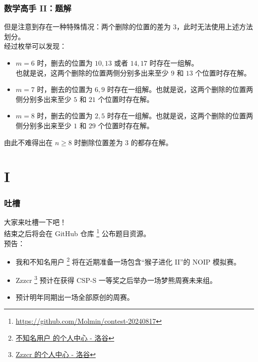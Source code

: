\documentclass{beamer}
\begin{document}
\begin{frame}
\frametitle{数学高手 II：题解}
但是注意到存在一种特殊情况：两个删除的位置的差为 $3$，此时无法使用上述方法划分。\\
\pause
经过枚举可以发现：
\begin{itemize}
\item $m=6$ 时，删去的位置为 $10,13$ 或者 $14,17$ 时存在一组解。\\
\pause
也就是说，这两个删除的位置两侧分别多出来至少 $9$ 和 $13$ 个位置时存在解。
\pause
\item $m=7$ 时，删去的位置为 $6,9$ 时存在一组解。也就是说，这两个删除的位置两侧分别多出来至少 $5$ 和 $21$ 个位置时存在解。
\pause
\item $m=8$ 时，删去的位置为 $2,5$ 时存在一组解。也就是说，这两个删除的位置两侧分别多出来至少 $1$ 和 $29$ 个位置时存在解。
\end{itemize}
\pause
由此不难得出在 $n \geq 8$ 时删除位置差为 $3$ 的都存在解。
\end{frame}

\section{I}

\begin{frame}
\frametitle{吐槽}
大家来吐槽一下吧！\\
结束之后将会在 GitHub 仓库 \footnote{\url{https://github.com/Molmin/contest-20240817}} 公布题目资源。\\
预告：
\begin{itemize}
\item 我和不知名用户 \footnote{\href{https://www.luogu.com.cn/user/316358}{不知名用户 的个人中心 - 洛谷}} 将在近期准备一场包含“猴子进化 II”的 NOIP 模拟赛。
\item Zzzcr \footnote{\href{https://www.luogu.com.cn/user/761491}{Zzzcr 的个人中心 - 洛谷}} 预计在获得 CSP-S 一等奖之后举办一场梦熊周赛未来组。
\item 预计明年同期出一场全部原创的周赛。
\end{itemize}

\end{frame}
\end{document}
